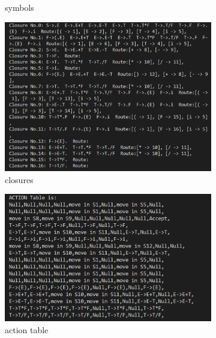 \documentclass{zpt}
\begin{document}
\begin{figure}
\begin{subfigure}[t]{0.45\textwidth}
            \caption{symbols}
            \label{fig::symbol}
        \end{subfigure}
        \begin{subfigure}[t]{0.45\textwidth}
            \includegraphics[width=\textwidth]{../resources/closures.png}
            \caption{closures}
            \label{fig::closure}
        \end{subfigure}
        \begin{subfigure}[t]{0.45\textwidth}
            \includegraphics[width=\textwidth]{../resources/action.png}
            \caption{action table}
            \label{fig::action}
        \end{subfigure}
        \begin{subfigure}[t]{0.45\textwidth}

\end{subfigure}
\end{figure}
\end{document}
